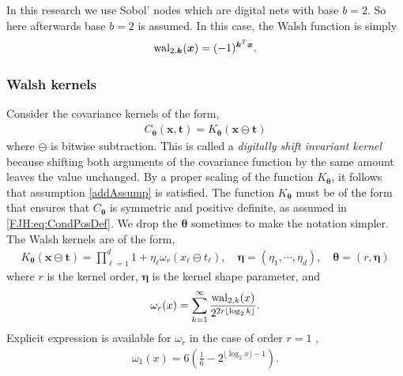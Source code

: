 \documentclass[graybox,footinfo]{svmult}
\let\vec\relax
\newcommand{\bm}[1]{\boldsymbol{#1}}
\newcommand{\veta}{{\bm{\eta}}}
\newcommand{\vtheta}{{\bm{\theta}}}
\newcommand{\vk}{\bm{k}}
\newcommand{\vt}{\bm{t}}
\newcommand{\vx}{\bm{x}}
\newcommand{\JRNote}[1]{{\textcolor{green}{JR: #1}}}
\begin{document}
In this research we use Sobol' nodes which are digital nets with base $b=2$. So here afterwards base $b=2$ is assumed. %
In this case, the Walsh function is simply $$\textup{wal}_{2,\vk} (\vx) = (-1)^{\vec{\vk}^T \vec{\vx}}.$$

\subsubsection{Walsh kernels}
Consider the covariance kernels of the form,
\begin{align}
\label{eqn:digital_shift_in_kernel}
C_{\vtheta}(\vx, \vt) = K_{\vtheta} (\vx \ominus \vt) 
\end{align}
where $\ominus$ is bitwise subtraction.
This is called a \emph{digitally shift invariant kernel} because shifting both arguments of the covariance function by the same amount leaves the value unchanged. By a proper scaling of the function $K_{\vtheta}$, it follows that assumption \eqref{addAssump} is satisfied. The function $K_{\vtheta}$ must be of the form that ensures that $C_{\vtheta}$ is symmetric and positive definite, as assumed in \eqref{FJH:eq:CondPosDef}. We drop the ${\vtheta}$ sometimes to make the notation simpler.
The Walsh kernels are of the form,
\begin{align}
\label{eqn:walsh_kernel}
K_{\vtheta} (\vx \ominus \vt) =  
\prod_{\ell=1}^d  1 + \eta_\ell \omega_{r} (x_\ell \ominus t_\ell), \quad \veta = (\eta_1, \cdots, \eta_d), \quad \vtheta = (r, \veta)
\end{align}
where $r$ is the kernel order, $\veta$ is the kernel shape parameter, and
\begin{align*}
\omega_r(x) = \sum_{k=1}^\infty 
\frac{\textup{wal}_{2,k}(x) }{2^{2r \lfloor \log_2 k \rfloor}}.
\end{align*}
Explicit expression is available for $\omega_{r}$ in the case of order $r=1$ \cite{Nuyens2013}, %
\begin{align}
\label{eqn:omega1}
\omega_1(x) 
= 6\left( \frac 16 - 2^{\lfloor \log_2 x \rfloor -1 }\right).
\end{align}
\end{document}
